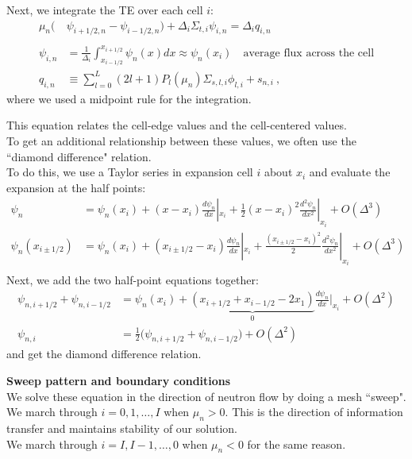 \documentclass[12pt]{article}
\begin{document}
%
Next, we integrate the TE over each cell $i$:
\begin{align*}
\mu_n\bigl(&\psi_{i+1/2,n} - \psi_{i-1/2,n} \bigr) + \Delta_i \Sigma_{t,i} \psi_{i,n} = \Delta_i q_{i,n}\\
&\\
\psi_{i,n} &= \frac{1}{\Delta_i}\int_{x_{i-1/2}}^{x_{i+1/2}} \psi_n(x) dx \approx \psi_n(x_i) \quad \text{average flux across the cell}\\
q_{i,n} &\equiv \sum_{l=0}^L (2l+1) P_l(\mu_n) \Sigma_{s,l,i} \phi_{l,i} + s_{n,i}\:,
\end{align*}
where we used a midpoint rule for the integration.

This equation relates the cell-edge values and the cell-centered values.\\
To get an additional relationship between these values, we often use the ``diamond difference" relation.\\
To do this, we use a Taylor series in expansion cell $i$ about $x_i$ and evaluate the expansion at the half points:
\begin{align*}
\psi_n &= \psi_n(x_i) + (x - x_i)\frac{d\psi_n}{dx}|_{x_i} + \frac{1}{2}(x - x_i)^2 \frac{d^2 \psi_n}{dx^2}|_{x_i} + O(\Delta^3)\\
\psi_{n}(x_{i \pm 1/2}) &= \psi_n(x_i) + (x_{i \pm 1/2} - x_i) \frac{d\psi_n}{dx}|_{x_i} + \frac{(x_{i\pm 1/2} - x_i)^2}{2} \frac{d^2 \psi_n}{dx^2}|_{x_i} + O(\Delta^3)\\
\end{align*}
Next, we add the two half-point equations together:
\begin{align*}
\psi_{n, i+1/2} + \psi_{n, i-1/2} &= \psi_n(x_i) + \underbrace{(x_{i+1/2} + x_{i-1/2} - 2x_1)}_{0} \frac{d \psi_n}{dx}|_{x_i} + O(\Delta^2)\\
\psi_{n, i} &= \frac{1}{2}\bigl(\psi_{n,i+1/2} + \psi_{n,i-1/2}\bigr) + O(\Delta^2)
\end{align*}
and get the diamond difference relation.

\textbf{Sweep pattern and boundary conditions}\\
We solve these equation in the direction of neutron flow by doing a mesh ``sweep". \\
We march through $i = 0, 1, \dots, I$ when $\mu_n > 0$. This is the direction of information transfer and maintains stability of our solution.\\
We march through $i = I, I-1, \dots, 0$ when $\mu_n < 0$ for the same reason.
\end{document}
